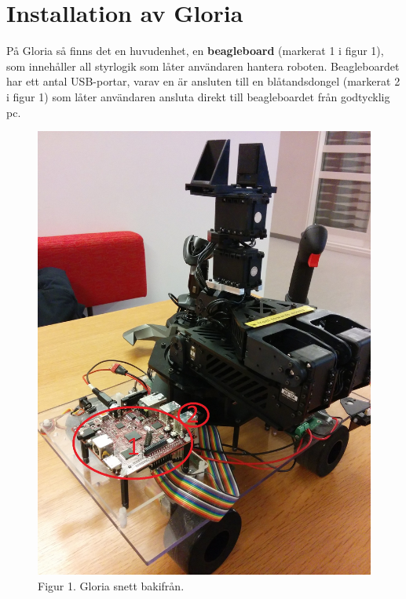 \section{Installation av Gloria}
På Gloria så finns det en huvudenhet, en \textbf{beagleboard} (markerat 1 i figur 1), som innehåller all styrlogik som låter användaren hantera roboten. Beagleboardet har ett antal USB-portar, varav en är ansluten till en blåtandsdongel (markerat 2 i figur 1) som låter användaren ansluta direkt till beagleboardet från godtycklig pc.

\begin{figure}[h!]
	\center
	\includegraphics[scale=0.2]{GloriaAnvh.jpg}
	\endcenter
	\caption{Figur 1. Gloria snett bakifrån.}
\end{figure}
\newpage
